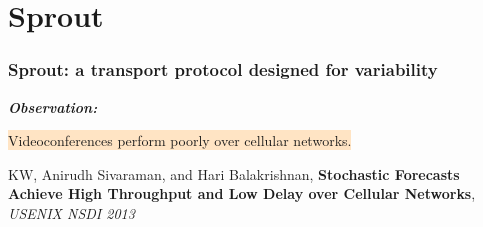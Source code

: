 \documentclass[svgnames]{beamer}
\begin{document}
\section{Sprout}

\begin{frame}
\frametitle{Sprout: a transport protocol designed for variability}

\large

\textit{\bf Observation:}

\hspace{10 pt} \colorbox{Bisque}{Videoconferences perform poorly over cellular networks.}

\vspace{\baselineskip}
\vspace{\baselineskip}
\vspace{\baselineskip}

\footnotesize

KW, Anirudh Sivaraman, and Hari Balakrishnan, \textbf{Stochastic Forecasts Achieve High Throughput and Low Delay over Cellular Networks}, \textit{USENIX NSDI 2013}

\end{frame}
\end{document}
